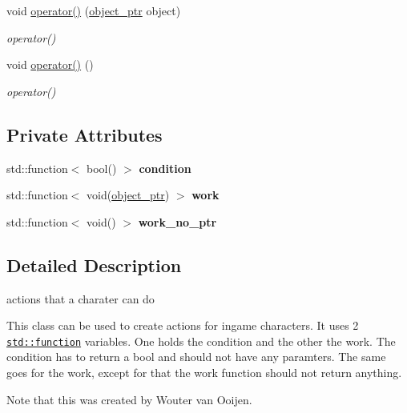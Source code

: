 \begin{DoxyCompactItemize}
void \hyperlink{classaction_ab4f8d0f7552450455977d09a889c18c7}{operator()} (\hyperlink{typedefs_8hpp_aab5add95f06d2ba25dbfed8eb07274fa}{object\+\_\+ptr} object)
\begin{DoxyCompactList}\small\item\em operator() \end{DoxyCompactList}\item 
void \hyperlink{classaction_a92c003677656b5b3e6e58b19376e6b04}{operator()} ()
\begin{DoxyCompactList}\small\item\em operator() \end{DoxyCompactList}\end{DoxyCompactItemize}
\subsection*{Private Attributes}
\begin{DoxyCompactItemize}
\item 
\mbox{\label{classaction_a949abf979a5255f54e88a6a4273afebe}} 
std\+::function$<$ bool() $>$ {\bfseries condition}
\item 
\mbox{\label{classaction_a711a393fce3b3b22930b651e24eda6c3}} 
std\+::function$<$ void(\hyperlink{typedefs_8hpp_aab5add95f06d2ba25dbfed8eb07274fa}{object\+\_\+ptr}) $>$ {\bfseries work}
\item 
\mbox{\label{classaction_a2b895e3240bf7d69ae7f8e3bd7e563d6}} 
std\+::function$<$ void() $>$ {\bfseries work\+\_\+no\+\_\+ptr}
\end{DoxyCompactItemize}


\subsection{Detailed Description}
actions that a charater can do 

This class can be used to create actions for ingame characters. It uses 2 \href{http://en.cppreference.com/w/cpp/utility/functional/function }{\tt std\+::function} variables. One holds the condition and the other the work. The condition has to return a bool and should not have any paramters. The same goes for the work, except for that the work function should not return anything.

\begin{DoxyNote}{Note}
that this was created by Wouter van Ooijen. 
\end{DoxyNote}


